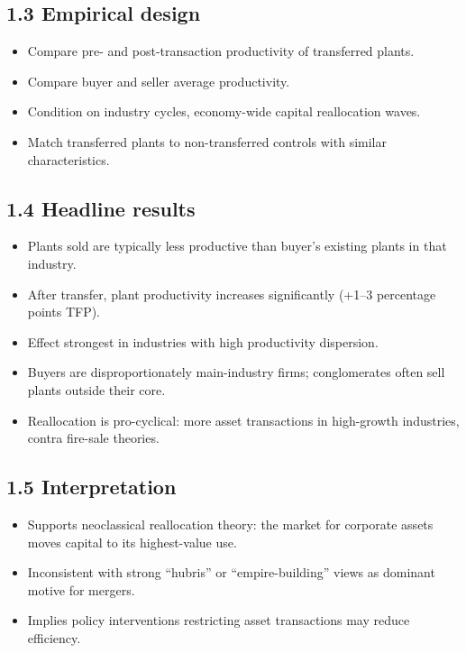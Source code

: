 \documentclass[11pt]{article}
\begin{document}
\subsection*{1.3 Empirical design}
\begin{itemize}
\item Compare pre- and post-transaction productivity of transferred plants.
\item Compare buyer and seller average productivity.
\item Condition on industry cycles, economy-wide capital reallocation waves.
\item Match transferred plants to non-transferred controls with similar characteristics.
\end{itemize}

\subsection*{1.4 Headline results}
\begin{itemize}
\item Plants sold are typically less productive than buyer's existing plants in that industry.
\item After transfer, plant productivity increases significantly (+1--3 percentage points TFP).
\item Effect strongest in industries with high productivity dispersion.
\item Buyers are disproportionately main-industry firms; conglomerates often sell plants outside their core.
\item Reallocation is pro-cyclical: more asset transactions in high-growth industries, contra fire-sale theories.
\end{itemize}

\subsection*{1.5 Interpretation}
\begin{itemize}
\item Supports neoclassical reallocation theory: the market for corporate assets moves capital to its highest-value use.
\item Inconsistent with strong ``hubris'' or ``empire-building'' views as dominant motive for mergers.
\item Implies policy interventions restricting asset transactions may reduce efficiency.
\end{itemize}
\end{document}
